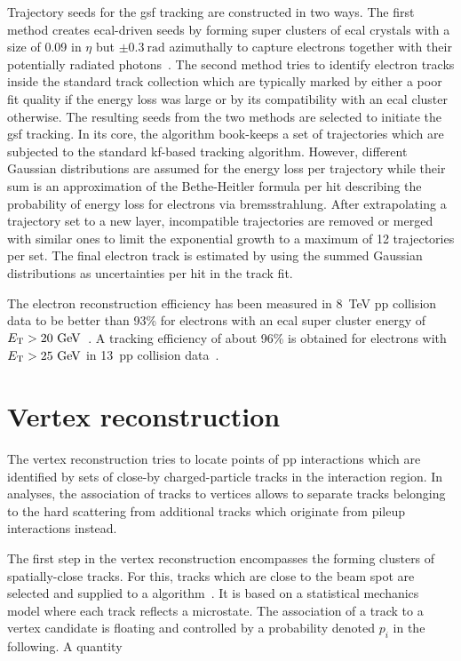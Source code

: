 Trajectory seeds for the \gls{gsf} tracking are constructed in two ways. The first method creates \gls{ecal}-driven seeds by forming super clusters of \gls{ecal} crystals with a size of 0.09 in $\eta$ but $\pm0.3~\mathrm{rad}$ azimuthally to capture electrons together with their potentially radiated photons~\cite{CMS:2010aua}. The second method tries to identify electron tracks inside the standard track collection which are typically marked by either a poor fit quality if the energy loss was large or by its compatibility with an \gls{ecal} cluster otherwise. The resulting seeds from the two methods are selected to initiate the \gls{gsf} tracking. In its core, the algorithm book-keeps a set of trajectories which are subjected to the standard \gls{kf}-based tracking algorithm. However, different Gaussian distributions are assumed for the energy loss per trajectory while their sum is an approximation of the Bethe-Heitler formula per hit describing the probability of energy loss for electrons via bremsstrahlung. After extrapolating a trajectory set to a new layer, incompatible trajectories are removed or merged with similar ones to limit the exponential growth to a maximum of 12 trajectories per set. The final electron track is estimated by using the summed Gaussian distributions as uncertainties per hit in the track fit. 

The electron reconstruction efficiency has been measured in 8~TeV \gls{pp} collision data to be better than 93\% for electrons with an \gls{ecal} super cluster energy of $E_\mathrm{T}>20~\textrm{GeV}$~\cite{Khachatryan:2015hwa}. A tracking efficiency of about 96\% is obtained for electrons with $E_\mathrm{T}>25~\textrm{GeV}$ in 13~\TeV \gls{pp} collision data~\cite{CMS-DP-2017-004}.



\section{Vertex reconstruction}


The vertex reconstruction tries to locate points of \gls{pp} interactions which are identified by sets of close-by charged-particle tracks in the interaction region. In analyses, the association of tracks to vertices allows to separate tracks belonging to the hard scattering from additional tracks which originate from pileup interactions instead.

The first step in the vertex reconstruction encompasses the forming clusters of spatially-close tracks. For this, tracks which are close to the beam spot are selected and supplied to a  algorithm~\cite{726788}. It is based on a statistical mechanics model where each track reflects a microstate. The association of a track to a vertex candidate is floating and controlled by a probability denoted $p_{i}$ in the following. A quantity

